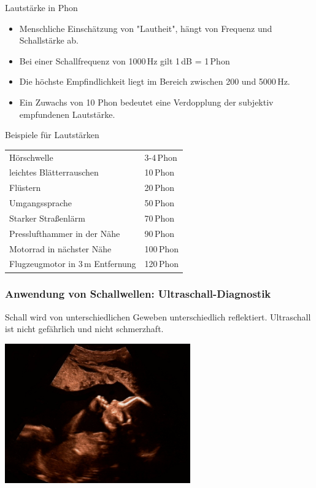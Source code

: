 \documentclass{beamer}
\begin{document}
\begin{frame}{Lautstärke in Phon}

\begin{itemize}
    \item 
    Menschliche Einschätzung von "Lautheit", hängt von Frequenz und Schallstärke ab. 
    \item
    Bei einer Schallfrequenz von 1000\,Hz gilt 1\,dB = 1\,Phon
    \item
    Die höchste Empfindlichkeit liegt im Bereich zwischen 200 und 5000\,Hz.
    \item
    Ein Zuwachs von 10 Phon bedeutet eine Verdopplung der subjektiv empfundenen Lautstärke.
\end{itemize}

    
\end{frame}

\begin{frame}{Beispiele für Lautstärken}

    
\begin{tabular}{ll}
Hörschwelle                         & 3-4\,Phon \\[0.2 cm]
leichtes Blätterrauschen            & 10\,Phon  \\[0.2 cm]
Flüstern                            & 20\,Phon  \\[0.2 cm]
Umgangssprache                      & 50\,Phon  \\[0.2 cm]
Starker Straßenlärm                 & 70\,Phon  \\[0.2 cm]
Presslufthammer in der Nähe         & 90\,Phon  \\[0.2 cm]
Motorrad in nächster Nähe           & 100\,Phon \\[0.2 cm]
Flugzeugmotor in 3\,m Entfernung    & 120\,Phon \\[0.2 cm]
\end{tabular}
\end{frame}




\begin{frame}
\frametitle{Anwendung von Schallwellen: Ultraschall-Diagnostik}

Schall wird von unterschiedlichen Geweben unterschiedlich reflektiert. Ultraschall ist nicht gefährlich und nicht schmerzhaft.

\begin{center}
\includegraphics[width=0.6\textwidth]{embryo.jpg}
\end{center}



\end{frame}
\end{document}
